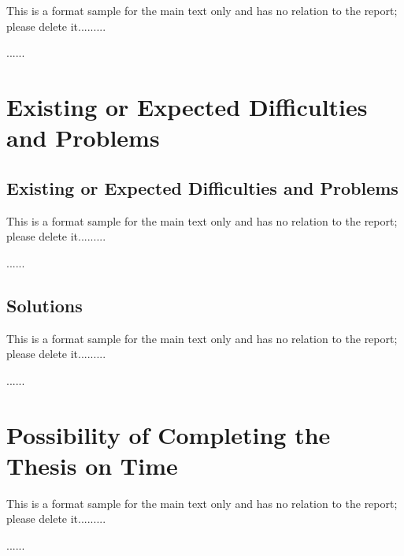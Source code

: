 This is a format sample for the main text only and has no relation to the report; please delete it.........

......

\section{Existing or Expected Difficulties and Problems}

\subsection{Existing or Expected Difficulties and Problems}

This is a format sample for the main text only and has no relation to the report; please delete it.........

......

\hitenter

\subsection{Solutions}

This is a format sample for the main text only and has no relation to the report; please delete it.........

......

\section{Possibility of Completing the Thesis on Time}

This is a format sample for the main text only and has no relation to the report; please delete it.........

......
